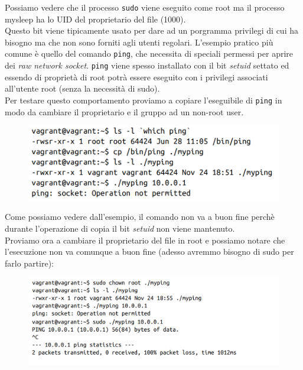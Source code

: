 Possiamo vedere che il processo \verb|sudo| viene eseguito come root ma il processo
mysleep ha lo UID del proprietario del file (1000).\\

Questo bit viene tipicamente usato per dare ad un porgramma privilegi di cui ha
bisogno ma che non sono forniti agli utenti regolari. L'esempio pratico più comune
è quello del comando \verb|ping|, che necessita di speciali permessi per aprire
dei \textit{raw network socket}. \verb|ping| viene spesso installato con il bit
\textit{setuid} settato ed essendo di proprietà di root potrà essere eseguito con
i privilegi associati all'utente root (senza la necessità di sudo).\\
Per testare questo comportamento proviamo a copiare l'eseguibile di \verb|ping|
in modo da cambiare il proprietario e il gruppo ad un non-root user.

\begin{figure}[H]
    \centering
    \includegraphics[width=\textwidth, keepaspectratio]{capitoli/os_security/imgs/ping1.png}
\end{figure}

Come possiamo vedere dall'esempio, il comando non va a buon fine perchè durante
l'operazione di copia il bit \textit{setuid} non viene mantenuto.\\

Proviamo ora a cambiare il proprietario del file in root e possiamo notare che
l'esecuzione non va comunque a buon fine (adesso avremmo bisogno di sudo per farlo partire):

\begin{figure}[H]
    \centering
    \includegraphics[width=\textwidth, keepaspectratio]{capitoli/os_security/imgs/ping2.png}
\end{figure}

